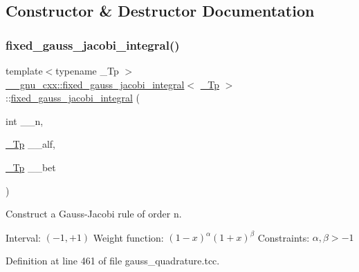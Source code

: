 \subsection{Constructor \& Destructor Documentation}
\mbox{\label{struct____gnu__cxx_1_1fixed__gauss__jacobi__integral_a2ee234de6447ed621c4199beb169126b}} 
\subsubsection{\texorpdfstring{fixed\+\_\+gauss\+\_\+jacobi\+\_\+integral()}{fixed\_gauss\_jacobi\_integral()}}
{\footnotesize\ttfamily template$<$typename \+\_\+\+Tp $>$ \\
\hyperlink{struct____gnu__cxx_1_1fixed__gauss__jacobi__integral}{\+\_\+\+\_\+gnu\+\_\+cxx\+::fixed\+\_\+gauss\+\_\+jacobi\+\_\+integral}$<$ \hyperlink{namespace____gnu__cxx_a3b19a9c800ca194374ef9172290f7d79}{\+\_\+\+Tp} $>$\+::\hyperlink{struct____gnu__cxx_1_1fixed__gauss__jacobi__integral}{fixed\+\_\+gauss\+\_\+jacobi\+\_\+integral} (\begin{DoxyParamCaption}\item[{int}]{\+\_\+\+\_\+n,  }\item[{\hyperlink{namespace____gnu__cxx_a3b19a9c800ca194374ef9172290f7d79}{\+\_\+\+Tp}}]{\+\_\+\+\_\+alf,  }\item[{\hyperlink{namespace____gnu__cxx_a3b19a9c800ca194374ef9172290f7d79}{\+\_\+\+Tp}}]{\+\_\+\+\_\+bet }\end{DoxyParamCaption})\hspace{0.3cm}{\ttfamily [explicit]}}

Construct a Gauss-\/\+Jacobi rule of order {\ttfamily n}.

Interval\+: $ (-1, +1) $ Weight function\+: $ (1-x)^\alpha (1+x)^\beta $ Constraints\+: $ \alpha, \beta > -1 $ 

Definition at line 461 of file gauss\+\_\+quadrature.\+tcc.



